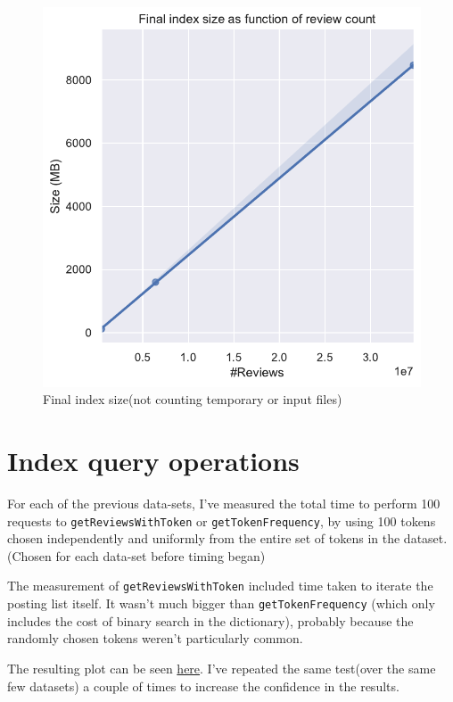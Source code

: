 \documentclass[11pt]{article}
\begin{document}
\begin{figure}[!htb]
	\caption{Final index size(not counting temporary or input files)}
	\label{fig:finalsize}
	\centering
	\includegraphics[width=\textwidth,height=\textheight,keepaspectratio]{diskusage2.pdf}
\end{figure}

\section{Index query operations}

For each of the previous data-sets, I've measured the total time to perform 100 requests to \texttt{getReviewsWithToken} or \texttt{getTokenFrequency}, by using 100 tokens chosen independently and uniformly from the entire set of tokens in the dataset.(Chosen for each data-set before timing began)

The measurement of \texttt{getReviewsWithToken} included time taken to iterate the posting list itself. It wasn't much bigger than \texttt{getTokenFrequency} (which only includes the cost of binary search in the dictionary), probably because the randomly chosen tokens weren't
particularly common. 

The resulting plot can be seen \hyperref[fig:ops]{here}. I've repeated the same test(over the same few datasets) a couple of times to increase the
confidence in the results. 
\end{document}
